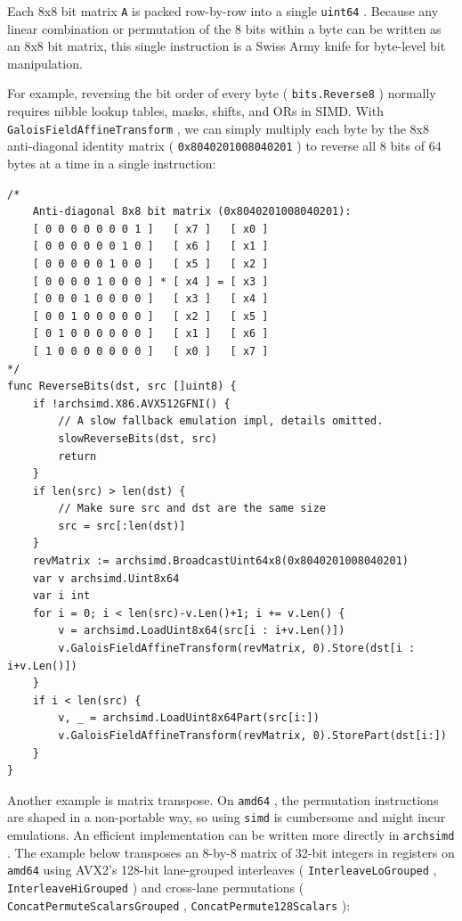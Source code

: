 \documentclass[11pt,a4paper]{article}
\begin{document}
Each 8x8 bit matrix \texttt{A} is packed row-by-row into a single \texttt{uint64} . Because any linear combination or permutation of the 8 bits within a byte can be written as an 8x8 bit matrix, this single instruction is a Swiss Army knife for byte-level bit manipulation.

For example, reversing the bit order of every byte ( \texttt{bits.Reverse8} ) normally requires nibble lookup tables, masks, shifts, and ORs in SIMD. With \texttt{GaloisFieldAffineTransform} , we can simply multiply each byte by the 8x8 anti-diagonal identity matrix ( \texttt{0x8040201008040201} ) to reverse all 8 bits of 64 bytes at a time in a single instruction:

\begin{verbatim}
/*
    Anti-diagonal 8x8 bit matrix (0x8040201008040201):
    [ 0 0 0 0 0 0 0 1 ]   [ x7 ]   [ x0 ]
    [ 0 0 0 0 0 0 1 0 ]   [ x6 ]   [ x1 ]
    [ 0 0 0 0 0 1 0 0 ]   [ x5 ]   [ x2 ]
    [ 0 0 0 0 1 0 0 0 ] * [ x4 ] = [ x3 ]
    [ 0 0 0 1 0 0 0 0 ]   [ x3 ]   [ x4 ]
    [ 0 0 1 0 0 0 0 0 ]   [ x2 ]   [ x5 ]
    [ 0 1 0 0 0 0 0 0 ]   [ x1 ]   [ x6 ]
    [ 1 0 0 0 0 0 0 0 ]   [ x0 ]   [ x7 ]
*/
func ReverseBits(dst, src []uint8) {
    if !archsimd.X86.AVX512GFNI() {
        // A slow fallback emulation impl, details omitted.
        slowReverseBits(dst, src)
        return
    }
    if len(src) > len(dst) {
        // Make sure src and dst are the same size
        src = src[:len(dst)]
    }
    revMatrix := archsimd.BroadcastUint64x8(0x8040201008040201)
    var v archsimd.Uint8x64
    var i int
    for i = 0; i < len(src)-v.Len()+1; i += v.Len() {
        v = archsimd.LoadUint8x64(src[i : i+v.Len()])
        v.GaloisFieldAffineTransform(revMatrix, 0).Store(dst[i : i+v.Len()])
    }
    if i < len(src) {
        v, _ = archsimd.LoadUint8x64Part(src[i:])
        v.GaloisFieldAffineTransform(revMatrix, 0).StorePart(dst[i:])
    }
}
\end{verbatim}

Another example is matrix transpose. On \texttt{amd64} , the permutation instructions are shaped in a non-portable way, so using \texttt{simd} is cumbersome and might incur emulations. An efficient implementation can be written more directly in \texttt{archsimd} . The example below transposes an 8-by-8 matrix of 32-bit integers in registers on \texttt{amd64} using AVX2's 128-bit lane-grouped interleaves ( \texttt{InterleaveLoGrouped} , \texttt{InterleaveHiGrouped} ) and cross-lane permutations ( \texttt{ConcatPermuteScalarsGrouped} , \texttt{ConcatPermute128Scalars} ):
\end{document}
